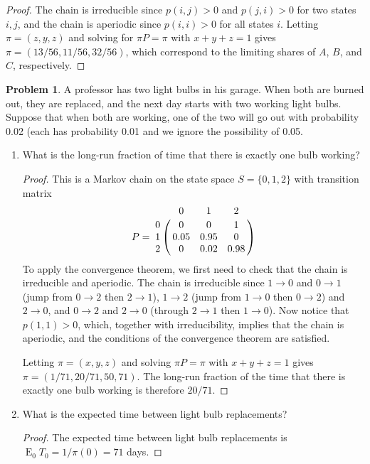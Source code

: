 \documentclass[oneside,reqno]{amsart}
\DeclareMathOperator{\E}{\mathrm{E}}
\theoremstyle{definition}
\newtheorem{prob}{Problem}
\begin{document}
\begin{proof}
The chain is irreducible since $p(i,j) > 0$ and $p(j, i) > 0$ for two states $i,j$, and the chain is aperiodic since $p(i,i) > 0$ for all states $i$. Letting $\pi = (z,y,z)$ and solving for $\pi P= \pi$ with $x+y+z = 1$ gives $\pi = (13/56, 11/56, 32/56)$, which correspond to the limiting shares of $A$, $B$, and $C$, respectively. 
\end{proof}




\begin{prob}
A professor has two light bulbs in his garage. When both are burned out, they are replaced, and the next day starts with two working light bulbs. Suppose that when both are working, one of the two will go out with probability 0.02 (each has probability 0.01 and we ignore the possibility of 0.05.
\end{prob}


\begin{enumerate}
\item
What is the long-run fraction of time that there is exactly one bulb working?
\begin{proof}
This is a Markov chain on the state space $S = \{0,1,2\}$ with transition matrix 
\[
	P = \bordermatrix{~ & 0 & 1 & 2 \cr 
		0 & 0 & 0 & 1  \cr
		1 & 0.05 & 0.95 & 0  \cr
		2 & 0 & 0.02 & 0.98  \cr}
\]
To apply the convergence theorem, we first need to check that the chain is irreducible and aperiodic. The chain is irreducible since $1 \to 0$ and $0 \to 1$ (jump from $0 \to 2$ then $2 \to 1$), $1 \to 2$ (jump from $1 \to 0$ then $0 \to 2$) and $2 \to 0$, and $0 \to 2$ and $2 \to 0$ (through $2 \to 1$ then $1 \to 0$). Now notice that $p(1,1) > 0$, which, together with irreducibility, implies that the chain is aperiodic, and the conditions of the convergence theorem are satisfied. 
\par
Letting $\pi = (x,y,z)$ and solving $\pi P = \pi$ with $x+y+z=1$ gives $\pi = (1/71, 20/71, 50,71)$. The long-run fraction of the time that there is exactly one bulb working is therefore $20/71$.
\end{proof}
\item
What is the expected time between light bulb replacements?
\begin{proof}
The expected time between light bulb replacements is $\E_0 T_0 = 1/\pi(0) = 71$ days.
\end{proof}
\end{enumerate}
\end{document}
